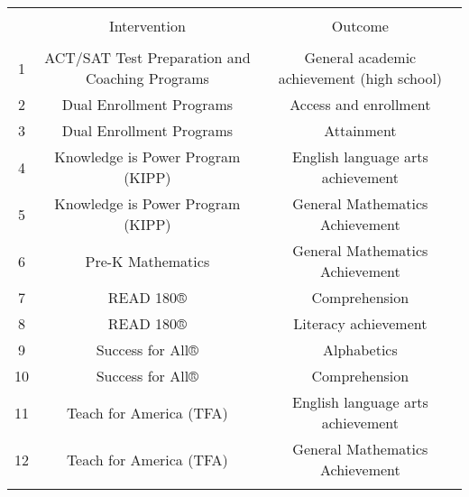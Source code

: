 
\begin{table}[!htbp] \centering 
  \caption{} 
  \label{all_tiers} 
\tiny 
\begin{tabular}{@{\extracolsep{1mm}} ccc} 
\\[-1.8ex]\hline 
\hline \\[-1.8ex] 
 & Intervention & Outcome \\ 
\hline \\[-1.8ex] 
1 & ACT/SAT Test Preparation and Coaching Programs & General academic achievement (high school) \\ 
2 & Dual Enrollment Programs & Access and enrollment \\ 
3 & Dual Enrollment Programs & Attainment \\ 
4 & Knowledge is Power Program (KIPP) & English language arts achievement \\ 
5 & Knowledge is Power Program (KIPP) & General Mathematics Achievement \\ 
6 & Pre-K Mathematics & General Mathematics Achievement \\ 
7 & READ 180® & Comprehension \\ 
8 & READ 180® & Literacy achievement \\ 
9 & Success for All® & Alphabetics \\ 
10 & Success for All® & Comprehension \\ 
11 & Teach for America (TFA) & English language arts achievement \\ 
12 & Teach for America (TFA) & General Mathematics Achievement \\ 
\hline \\[-1.8ex] 
\end{tabular} 
\end{table} 
